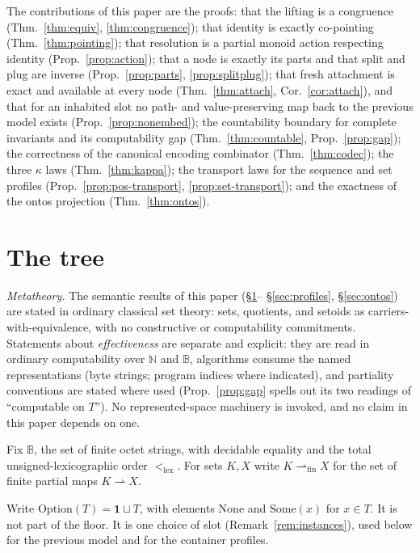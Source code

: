 \documentclass[11pt]{article}
\theoremstyle{definition}
\newcommand{\Bytes}{\mathbb{B}}                    %
\newcommand{\finmap}[2]{#1 \rightharpoonup_{\mathrm{fin}} #2}
\newcommand{\lex}{<_{\mathrm{lex}}}
\begin{document}
The contributions of this paper are the proofs: that the lifting is a congruence
(Thm.~\ref{thm:equiv}, \ref{thm:congruence}); that identity is exactly co-pointing
(Thm.~\ref{thm:pointing}); that resolution is a partial monoid action respecting
identity (Prop.~\ref{prop:action}); that a node is exactly its parts and that split
and plug are inverse (Prop.~\ref{prop:parts}, \ref{prop:splitplug}); that fresh
attachment is exact and available at every node (Thm.~\ref{thm:attach},
Cor.~\ref{cor:attach}), and that for an inhabited slot no path- and value-preserving map
back to the previous model exists (Prop.~\ref{prop:nonembed}); the countability boundary for complete invariants
and its computability gap (Thm.~\ref{thm:countable}, Prop.~\ref{prop:gap}); the
correctness of the canonical encoding combinator (Thm.~\ref{thm:codec}); the three
$\kappa$ laws (Thm.~\ref{thm:kappa}); the transport laws for the sequence and set
profiles (Prop.~\ref{prop:pos-transport}, \ref{prop:set-transport}); and the exactness
of the ontos projection (Thm.~\ref{thm:ontos}).

\section{The tree}\label{sec:tree}

\emph{Metatheory.} The semantic results of this paper (\S\ref{sec:tree}--%
\S\ref{sec:profiles}, \S\ref{sec:ontos}) are stated in ordinary classical set theory:
sets, quotients, and setoids as carriers-with-equivalence, with no constructive or
computability commitments. Statements about \emph{effectiveness} are separate and
explicit: they are read in ordinary computability over $\mathbb{N}$ and $\Bytes$,
algorithms consume the named representations (byte strings; program indices where
indicated), and partiality conventions are stated where used
(Prop.~\ref{prop:gap} spells out its two readings of ``computable on $T$''). No
represented-space machinery is invoked, and no claim in this paper depends on one.

Fix $\Bytes$, the set of finite octet strings, with decidable equality and the total
unsigned-lexicographic order $\lex$. For sets $K, X$ write $\finmap{K}{X}$ for the set
of finite partial maps $K \rightharpoonup X$.

Write $\mathrm{Option}(T) = \mathbf{1} \sqcup T$, with elements $\mathrm{None}$ and
$\mathrm{Some}(x)$ for $x \in T$. It is not part of the floor. It is one choice of slot
(Remark~\ref{rem:instances}), used below for the previous model and for the container
profiles.
\end{document}
